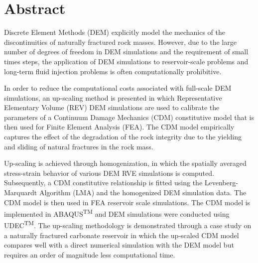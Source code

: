 \section{Abstract}
Discrete Element Methods (DEM) explicitly model the mechanics of the discontinuities of naturally fractured rock masses. However, due to the large number of degrees of freedom in DEM simulations and the requirement of small times steps, the application of DEM simulations to reservoir-scale problems and long-term fluid injection problems is often computationally prohibitive.

In order to reduce the computational costs associated with full-scale DEM simulations, an up-scaling method is presented in which Representative Elementary Volume (REV) DEM simulations are used to calibrate the parameters of a Continuum Damage Mechanics (CDM) constitutive model that is then used for Finite Element Analysis (FEA). The CDM model empirically captures the effect of the degradation of the rock integrity due to the yielding and sliding of natural fractures in the rock mass.

Up-scaling is achieved through homogenization, in which the spatially averaged stress-strain behavior of various DEM RVE simulations is computed. Subsequently, a CDM constitutive relationship is fitted using the Levenberg-Marquardt Algorithm (LMA) and the homogenized DEM simulation data. The CDM model is then used in FEA reservoir scale simulations. The CDM model is implemented in ABAQUS\textsuperscript{TM} and DEM simulations were conducted using UDEC\textsuperscript{TM}. The up-scaling methodology is demonstrated through a case study on a naturally fractured carbonate reservoir in which the up-scaled CDM model compares well with a direct numerical simulation with the DEM model but requires an order of magnitude less computational time.